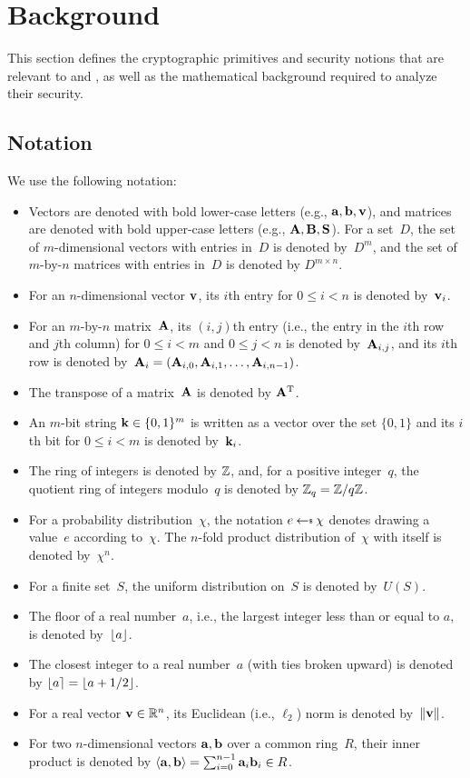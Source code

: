 \section{Background}%
\label{sec:background}

This section defines the cryptographic primitives and security notions that
are relevant to \FrodoPKE and \FrodoKEM, as well as the mathematical
background required to analyze their security.

\subsection{Notation}%
\label{sec:notation}

\ifshoworiginal
We use the following notation:

\begin{itemize}
\item Vectors are denoted with bold lower-case letters (e.g.,
  $\mathbf{a}, \mathbf{b}, \mathbf{v}$), and matrices are denoted with bold upper-case
  letters (e.g., $\mathbf{A}, \mathbf{B}, \mathbf{S}$). For a set~$D$, the set of
  $m$-dimensional vectors with entries in~$D$ is denoted by~$D^{m}$,
  and the set of $m$-by-$n$ matrices with entries
  in~$D$ is denoted by $D^{m \times n}$.
\item For an $n$-dimensional vector $\mathbf{v}$, its $i$th entry for
  $0\leq i < n$ is denoted by~$\mathbf{v}_i$.
\item For an $m$-by-$n$ matrix~$\mathbf{A}$, its $(i,j)$th entry (i.e., the
  entry in the $i$th row and $j$th column) for $0 \leq i <m$ and
  $0 \leq j < n$ is denoted by~$\mathbf{A}_{i,j}$, and its $i$th row is
  denoted by~$\mathbf{A}_i = (\mathbf{A}_{i,0},\mathbf{A}_{i,1},\ldots,\mathbf{A}_{i,n-1})$.
\item The transpose of a matrix~$\mathbf{A}$ is denoted by $\mathbf{A}^\text{T}$.  
\item An $m$-bit string $\mathbf{k}\in \{0,1\}^m$ is written as a vector over
  the set $\{0,1\}$ and its $i$th bit for
  $0 \leq i < m$ is denoted by~$\mathbf{k}_i$. 
\item The ring of integers is denoted by $\mathbb{Z}$, and, for a positive
  integer~$q$, the quotient ring of integers modulo~$q$ is denoted by
  $\mathbb{Z}_q = \mathbb{Z}/q\mathbb{Z}$.
\item For a probability distribution~$\chi$, the notation
  $e \getsr \chi$ denotes drawing a value~$e$ according to~$\chi$.
  The $n$-fold product distribution of~$\chi$ with itself is denoted
  by~$\chi^{n}$.
\item For a finite set~$S$, the uniform
  distribution on~$S$ is denoted by~$U(S)$.
\item The floor of a real number~$a$, i.e., the largest integer less
  than or equal to $a$, is denoted by~$\lfloor a\rfloor$.
\item The closest integer to a real number~$a$ (with ties broken
  upward) is denoted by $\lfloor a\rceil = \lfloor a+1/2\rfloor$.
\item For a real vector $\mathbf{v}\in \mathbb{R}^n$, its Euclidean (i.e.,
  $\ell_{2}$) norm is denoted by~$\lVert\mathbf{v}\rVert$.
\item For two $n$-dimensional vectors $\mathbf{a}, \mathbf{b}$ over a common
  ring~$R$, their inner product is denoted by
  $\langle\mathbf{a}, \mathbf{b}\rangle = \sum_{i=0}^{n-1} \mathbf{a}_{i} \mathbf{b}_{i} \in
  R$.
\end{itemize}

